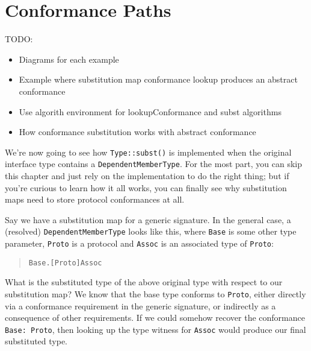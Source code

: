 \documentclass[a4paper,headsepline,bibliography=totoc,toc=flat,fleqn,twoside=semi]{scrbook}
\theoremstyle{definition}
\theoremstyle{definition}
\theoremstyle{definition}
\newcommand{\ifWIP}{\iffalse}
\begin{document}
\chapter{Conformance Paths}\label{conformance paths}

\ifWIP
TODO:
\begin{itemize}
\item Diagrams for each example
\item Example where substitution map conformance lookup produces an abstract conformance
\item Use algorith environment for lookupConformance and subst algorithms
\item How conformance substitution works with abstract conformance
\end{itemize}

We're now going to see how \texttt{Type::subst()} is implemented when the original interface type contains a \texttt{DependentMemberType}. For the most part, you can skip this chapter and just rely on the implementation to do the right thing; but if you're curious to learn how it all works, you can finally see why substitution maps need to store protocol conformances at all.

Say we have a substitution map for a generic signature. In the general case, a (resolved) \texttt{DependentMemberType} looks like this, where \texttt{Base} is some other type parameter, \texttt{Proto} is a protocol and \texttt{Assoc} is an associated type of \texttt{Proto}:
\begin{quote}
\texttt{Base.[Proto]Assoc}
\end{quote}

What is the substituted type of the above original type with respect to our substitution map? We know that the base type conforms to \texttt{Proto}, either directly via a conformance requirement in the generic signature, or indirectly as a consequence of other requirements. If we could somehow recover the conformance \texttt{Base:\ Proto}, then looking up the type witness for \texttt{Assoc} would produce our final substituted type.
\end{document}

